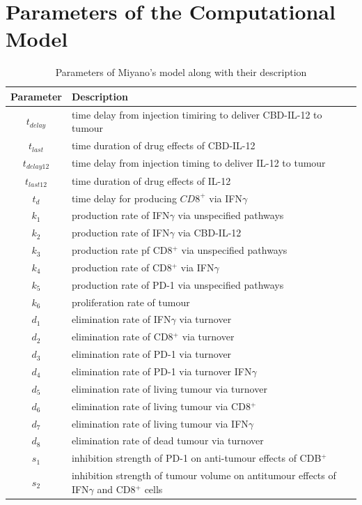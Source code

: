 \documentclass[11pt]{article}
\begin{document}
\section{Parameters of the Computational Model}\label{app}
\begin{table}[!h]
    \centering
    \caption{Parameters of Miyano's model along with their description}
    \begin{tabular}{c |l}
        \hline 
        Parameter & Description \\ \hline
        $t_{delay}$ & time delay from injection timiring to deliver CBD-IL-12 to tumour \\ 
        $t_{last}$ & time duration of drug effects of CBD-IL-12 \\ 
        $t_{delay12}$ & time delay from injection timing to deliver IL-12 to tumour \\
        $t_{last12}$ & time duration of drug effects of IL-12 \\ 
        $t_d$ & time delay for producing $CD8^+$ via IFN$\gamma$ \\ \hdashline
        $k_1$ & production rate of IFN$\gamma$ via unspecified pathways \\ 
        $k_2$ & production rate of IFN$\gamma$ via CBD-IL-12 \\ 
        $k_3$ & production rate pf CD8$^+$ via unspecified pathways \\ 
        $k_4$ & production rate of CD8$^+$ via IFN$\gamma$ \\ 
        $k_5$ & production rate of PD-1 via unspecified pathways \\ 
        $k_6$ & proliferation rate of tumour \\ \hdashline
        $d_1$ & elimination rate of IFN$\gamma$ via turnover \\
        $d_2$ & elimination rate of CD8$^+$ via turnover \\ 
        $d_3$ & elimination rate of PD-1 via turnover  \\ 
        $d_4$ & elimination rate of PD-1 via turnover IFN$\gamma$ \\ 
        $d_5$ & elimination rate of living tumour via turnover \\ 
        $d_6$ & elimination rate of living tumour via CD8$^+$ \\ 
        $d_7$ & elimination rate of living tumour via IFN$\gamma$ \\ 
        $d_8$ & elimination rate of dead tumour via turnover \\\hdashline
        $s_1$ & inhibition strength of PD-1 on anti-tumour effects of CDB$^+$ \\ 
        $s_2$ & inhibition strength of tumour volume on antitumour effects of IFN$\gamma$ and CD8$^+$ cells \\ \hline
    \end{tabular}
\end{table}

\clearpage
\newpage



\end{document}
